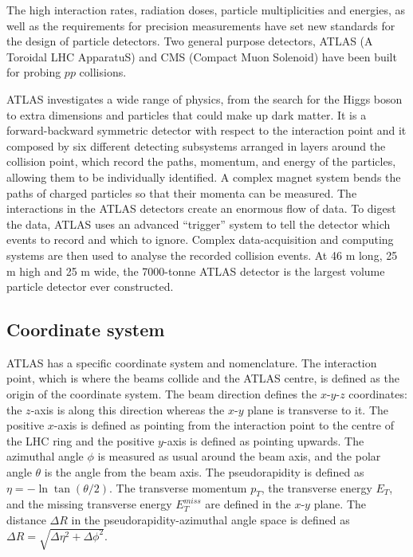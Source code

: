 \documentclass[a4paper, oneside, 11pt, openright]{book}
\begin{document}
			The high interaction rates, radiation doses, particle multiplicities and energies, as well as the requirements for precision measurements have set new standards for the design of particle detectors. Two general purpose detectors, ATLAS (A Toroidal LHC ApparatuS) and CMS (Compact Muon Solenoid) have been built for probing $pp$ collisions.
	
			ATLAS \cite{ATLAS_DESIGN_2008} investigates a wide range of physics, from the search for the Higgs boson to extra dimensions and particles that could make up dark matter. It is a forward-backward symmetric detector with respect to the interaction point and it composed by six different detecting subsystems arranged in layers around the collision point, which record the paths, momentum, and energy of the particles, allowing them to be individually identified. A complex magnet system bends the paths of charged particles so that their momenta can be measured. The interactions in the ATLAS detectors create an enormous flow of data. To digest the data, ATLAS uses an advanced “trigger” system to tell the detector which events to record and which to ignore. Complex data-acquisition and computing systems are then used to analyse the recorded collision events. At 46 m long, 25 m high and 25 m wide, the 7000-tonne ATLAS detector is the largest volume particle detector ever constructed.
			
			\subsection{Coordinate system}
				ATLAS has a specific coordinate system and nomenclature. The interaction point, which is where the beams collide and the ATLAS centre, is defined as the origin of the coordinate system. The beam direction defines the $x$-$y$-$z$ coordinates: the $z$-axis is along this direction whereas the $x$-$y$ plane is transverse to it. The positive $x$-axis is defined as pointing from the interaction point to the centre of the LHC ring and the positive $y$-axis is defined as pointing upwards. The azimuthal angle $\phi$ is measured as usual around the beam axis, and the polar angle $\theta$ is the angle from the beam axis. The pseudorapidity is defined as $\eta = - \ln \tan(\theta/2)$. The transverse momentum $p_T$, the transverse energy $E_T$, and the missing transverse energy $E_T^{miss}$ are defined in the $x$-$y$ plane.
				The distance $\Delta R$ in the pseudorapidity-azimuthal angle space is defined as $\Delta R = \sqrt{\Delta\eta^2 + \Delta\phi^2}$.
				
\end{document}
